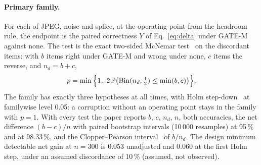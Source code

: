 \paragraph{Primary family.}
For each of JPEG, noise and splice, at the operating point from the headroom rule, the endpoint is the paired correctness
$Y$ of Eq.~\eqref{eq:delta} under GATE-M against none.
The test is the exact two-sided McNemar test~\citep{mcnemar1947} on the discordant items: with $b$ items right under GATE-M and
wrong under none, $c$ items the reverse, and $n_d=b+c$,
\begin{equation}
p=\min\Big\{1,\ 2\,\PP\big(\mathrm{Bin}(n_d,\tfrac12)\le\min(b,c)\big)\Big\}.
\label{eq:mcnemar}
\end{equation}
The family has exactly three hypotheses at all times, with Holm step-down~\citep{holm1979sequentially} at familywise level 0.05:
a corruption without an operating point stays in the family with $p=1$.
With every test the paper reports $b$, $c$, $n_d$, $n$, both accuracies, the net difference $(b-c)/n$ with paired bootstrap
intervals (10\,000 resamples) at 95\,\% and at 98.33\,\%, and the Clopper--Pearson interval~\citep{clopper1934} of $b/n_d$.
The design minimum detectable net gain at $n=300$ is 0.053 unadjusted and 0.060 at the first Holm step, under an assumed
discordance of 10\,\% (assumed, not observed).

